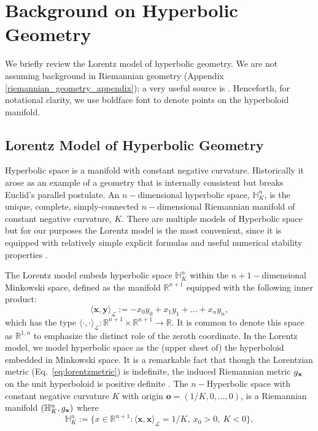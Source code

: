 \section{Background on Hyperbolic Geometry}
We briefly review the Lorentz model of hyperbolic geometry. We are not
assuming background in Riemannian geometry (Appendix \ref{riemannian_geometry_appendix});  a very useful source is \cite{Ratcliffe94}. Henceforth, for notational clarity, we use boldface font to denote points on the hyperboloid manifold.

\subsection{Lorentz Model of Hyperbolic Geometry}
Hyperbolic space is a manifold with constant negative curvature.  Historically it arose as an example of a geometry that is internally consistent but breaks Euclid's parallel postulate.  An $n-$dimensional hyperbolic space, $\mathbb{H}^n_K$, is the unique, complete, simply-connected $n-$dimensional Riemannian manifold of constant negative curvature, $K$.  There are multiple models of Hyperbolic space but for our purposes the Lorentz model is the most convenient, since it is equipped with relatively simple explicit formulas and useful numerical stability properties \cite{nickel2018learning}.

The Lorentz model embeds hyperbolic space $\mathbb{H}^n_K$ within the $n+1-$dimensional Minkowski space, defined as the manifold $\mathbb{R}^{n+1}$ equipped with the following inner product:
\begin{equation}\label{eq:lorentzmetric}
    \langle \textbf{x}, \textbf{y} \rangle_{\mathcal{L}} := -x_0y_0 + x_1y_1 + \dots + x_ny_n,
\end{equation}
which has the type 
$\langle \cdot, \cdot \rangle_{\mathcal{L}}: \mathbb{R}^{n+1} \times \mathbb{R}^{n+1} \to \mathbb{R}$.
It is common to denote this space as $\mathbb{R}^{1,n}$ to emphasize the distinct role of the zeroth coordinate.
In the Lorentz model, we model hyperbolic space as the (upper sheet of) the hyperboloid embedded in Minkowski space. It is a remarkable fact that though the Lorentzian metric (Eq.~\ref{eq:lorentzmetric}) is indefinite,
the induced Riemannian metric $g_{\mathbf{x}}$ on the unit hyperboloid is positive definite \cite{Ratcliffe94}. The $n-$Hyperbolic space with constant negative curvature $K$ with origin $\textbf{o} = (1/K, 0, \dots, 0)$, is a Riemannian manifold $(\mathbb{H}^{n}_K,g_{\mathbf{x}})$ where
\begin{equation*}
    \mathbb{H}^{n}_K := \{x \in \mathbb{R}^{n+1}:  \langle \textbf{x}, \textbf{x} \rangle_{\mathcal{L}} = 1/K, \ x_0 > 0, \ K<0 \},
\end{equation*}

